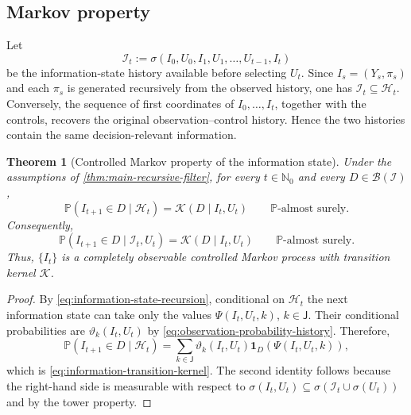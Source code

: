 \documentclass[10pt,twocolumn]{article}
\newtheorem{theorem}{Theorem}
\theoremstyle{remark}
\newcommand{\N}{\mathbb{N}}
\newcommand{\Pp}{\mathbb{P}}
\newcommand{\B}{\mathcal{B}}
\newcommand{\Hh}{\mathcal{H}}
\newcommand{\Ical}{\mathcal{I}}
\newcommand{\one}{\mathbf{1}}
\begin{document}
\subsection{Markov property}
\label{subsec:information-markov-property}

Let
\begin{equation}
	\mathscr I_t
	:=\sigma(I_0,U_0,I_1,U_1,\ldots,U_{t-1},I_t)
	\label{eq:information-history-filtration}
\end{equation}
be the information-state history available before selecting $U_t$. Since $I_s=(Y_s,\pi_s)$ and each $\pi_s$ is generated recursively from the observed history, one has $\mathscr I_t\subseteq\Hh_t$. Conversely, the sequence of first coordinates of $I_0,\ldots,I_t$, together with the controls, recovers the original observation--control history. Hence the two histories contain the same decision-relevant information.

\begin{theorem}[Controlled Markov property of the information state]
	\label{thm:information-controlled-markov}
	Under the assumptions of \cref{thm:main-recursive-filter}, for every $t\in\N_0$ and every $D\in\B(\Ical)$,
	\begin{equation*}
		\Pp(I_{t+1}\in D\mid\Hh_t)
		=\mathcal K(D\mid I_t,U_t)
		\qquad \Pp\text{-almost surely}.
		\label{eq:information-markov-H}
	\end{equation*}
	Consequently,
	\begin{equation*}
		\Pp(I_{t+1}\in D\mid\mathscr I_t,U_t)
		=\mathcal K(D\mid I_t,U_t)
		\qquad \Pp\text{-almost surely}.
		\label{eq:information-markov-I}
	\end{equation*}
	Thus, $\{I_t\}$ is a completely observable controlled Markov process with transition kernel $\mathcal K$.
\end{theorem}

\begin{proof}
	By \cref{eq:information-state-recursion}, conditional on $\Hh_t$ the next information state can take only the values $\Psi(I_t,U_t,k)$, $k\in\mathsf J$. Their conditional probabilities are $\vartheta_k(I_t,U_t)$ by \cref{eq:observation-probability-history}. Therefore,
	\[
	\Pp(I_{t+1}\in D\mid\Hh_t)
	=\sum_{k\in\mathsf J}
	\vartheta_k(I_t,U_t)
	\one_D\!\left(\Psi(I_t,U_t,k)\right),
	\]
	which is \cref{eq:information-transition-kernel}. The second identity follows because the right-hand side is measurable with respect to $\sigma(I_t,U_t)\subseteq \sigma(\mathscr I_t\cup\sigma(U_t))$ and by the tower property.
\end{proof}
\end{document}
